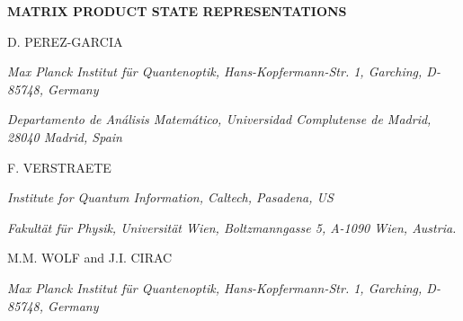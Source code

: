 \documentclass[aps,prl,epsfig,graphics,floatfix,mathbbm,a4paper]{article}
\newcommand{\1}{\mathbbm{1}}
\renewcommand{\>}{\rangle}
\newcommand{\<}{\langle}
\newcommand{\proofend}{\hfill\fbox\\\medskip }
\begin{document}



\newtheorem{theorem}{Theorem}
\newtheorem{proposition}{Proposition}

\newtheorem{lemma}{Proposition}

\newtheorem{definition}{Definition}
\newtheorem{corollary}{Corollary}

\newcommand{\proof}[1]{{\bf Proof.} #1 $\proofend$}
\vspace*{0.88truein}


\centerline{\bf
    MATRIX PRODUCT STATE REPRESENTATIONS} \vspace*{0.035truein}
\vspace*{0.37truein} \centerline{\footnotesize
    D. PEREZ-GARCIA} \vspace*{0.015truein}
\centerline{\footnotesize\it Max Planck Institut f\"{u}r
Quantenoptik, Hans-Kopfermann-Str. 1, Garching, D-85748, Germany}
\baselineskip=10pt \centerline{\footnotesize\it Departamento de
    An\'alisis Matem\'atico, Universidad Complutense de Madrid, 28040
    Madrid, Spain} \vspace*{10pt}

\centerline{\footnotesize F. VERSTRAETE} \vspace*{0.015truein}
\centerline{\footnotesize\it Institute for Quantum Information,
    Caltech, Pasadena, US} \baselineskip=10pt
\centerline{\footnotesize\it Fakult\"{a}t f\"{u}r Physik,
Universit\"{a}t Wien, Boltzmanngasse 5, A-1090 Wien, Austria.}
\vspace*{10pt}

\centerline{\footnotesize M.M. WOLF and J.I. CIRAC}
\vspace*{0.015truein} \centerline{\footnotesize\it Max Planck
Institut f\"{u}r Quantenoptik, Hans-Kopfermann-Str. 1, Garching,
D-85748, Germany} \vspace*{0.225truein}





\vspace*{0.21truein}

\end{document}
